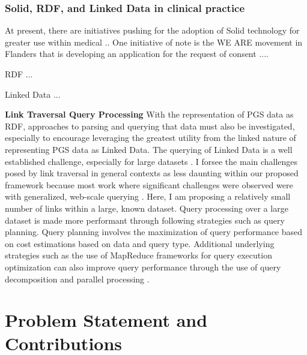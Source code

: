 \documentclass[runningheads]{llncs}
\begin{document}
\subsubsection{Solid, RDF, and Linked Data in clinical practice}
At present, there are initiatives pushing for the adoption of Solid technology for greater use within medical ..
One initiative of note is the WE ARE movement in Flanders that is developing an application for the request of consent ....

RDF ...

Linked Data ...

\textbf{Link Traversal Query Processing}
With the representation of PGS data as RDF, approaches to parsing and querying that data must also be investigated, especially to encourage leveraging the greatest utility from the linked nature of representing PGS data as Linked Data.
The querying of Linked Data is a well established challenge, especially for large datasets \cite{taelman_evaluation_2023}.
I forsee the main challenges posed by link traversal in general contexts as less daunting within our proposed framework because most work where significant challenges were observed were with generalized, web-scale querying \cite{taelman_evaluation_2023}. 
Here, I am proposing a relatively small number of links within a large, known dataset. 
Query processing over a large dataset is made more performant through following strategies such as query planning.
Query planning involves the maximization of query performance based on cost estimations based on data and query type. 
Additional underlying strategies such as the use of MapReduce frameworks for query execution optimization can also improve query performance through the use of query decomposition and parallel processing \cite{shim_mapreduce_2013}.  


\section{Problem Statement and Contributions}

\end{document}
